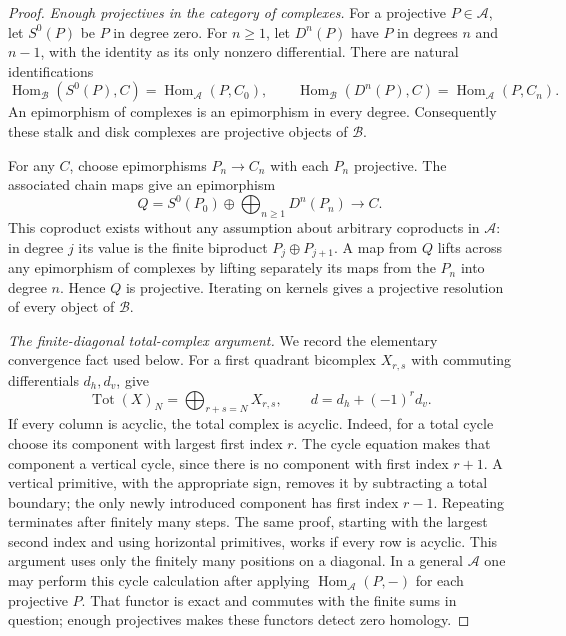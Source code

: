 \begin{proof}
\emph{Enough projectives in the category of complexes.}
For a projective $P\in\mathcal A$, let $S^0(P)$ be $P$ in degree zero.
For $n\geq1$, let $D^n(P)$ have $P$ in degrees $n$ and $n-1$,
with the identity as its only nonzero differential.  There are natural
identifications
\[
 \operatorname{Hom}_{\mathcal B}(S^0(P),C)
       =\operatorname{Hom}_{\mathcal A}(P,C_0),
 \qquad
 \operatorname{Hom}_{\mathcal B}(D^n(P),C)
       =\operatorname{Hom}_{\mathcal A}(P,C_n).
\]
An epimorphism of complexes is an epimorphism in every degree.
Consequently these stalk and disk complexes are projective objects of
$\mathcal B$.

For any $C$, choose epimorphisms $P_n\to C_n$ with each $P_n$
projective.  The associated chain maps give an epimorphism
\[
 Q=S^0(P_0)\oplus\bigoplus_{n\geq1}D^n(P_n)\longrightarrow C.
\]
This coproduct exists without any assumption about arbitrary
coproducts in $\mathcal A$: in degree $j$ its value is the finite
biproduct $P_j\oplus P_{j+1}$.  A map from $Q$ lifts across any
epimorphism of complexes by lifting separately its maps from the
$P_n$ into degree $n$.  Hence $Q$ is projective.  Iterating on kernels
gives a projective resolution of every object of $\mathcal B$.

\emph{The finite-diagonal total-complex argument.}
We record the elementary convergence fact used below.  For a first
quadrant bicomplex $X_{r,s}$ with commuting differentials $d_h,d_v$,
give
\[
 \operatorname{Tot}(X)_N=\bigoplus_{r+s=N}X_{r,s},
 \qquad d=d_h+(-1)^r d_v.
\]
If every column is acyclic, the total complex is acyclic.  Indeed, for
a total cycle choose its component with largest first index $r$.
The cycle equation makes that component a vertical cycle, since there
is no component with first index $r+1$.  A vertical primitive, with
the appropriate sign, removes it by subtracting a total boundary;
the only newly introduced component has first index $r-1$.  Repeating
terminates after finitely many steps.  The same proof, starting with
the largest second index and using horizontal primitives, works if
every row is acyclic.  This argument uses only the finitely many
positions on a diagonal.  In a general $\mathcal A$ one may perform
this cycle calculation after applying
$\operatorname{Hom}_{\mathcal A}(P,-)$ for each projective $P$.
That functor is exact and commutes with the finite sums in question;
enough projectives makes these functors detect zero homology.


\end{proof}

